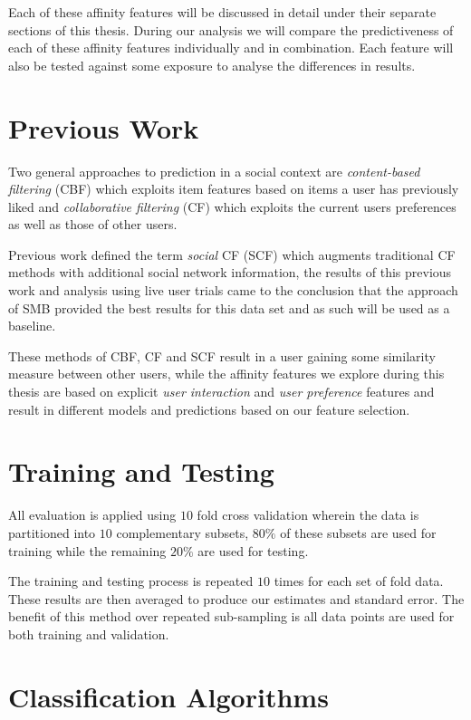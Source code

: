 Each of these affinity features will be discussed in detail under their separate sections of this thesis.
During our analysis we will compare the predictiveness of each of these affinity features individually and in combination.
Each feature will also be tested against some exposure to analyse the differences in results.

\section{Previous Work}
\label{sec:pw}

Two general approaches to prediction in a social context are \emph{content-based filtering} (CBF) \cite{newsweeder} which exploits 
item features based on items a user has previously liked and  \emph{collaborative filtering} (CF) 
\cite{collab_filtering} which exploits the current users preferences as well as those of other users. 

Previous work defined the term \emph{social} CF (SCF) \cite{joseph} which augments traditional CF methods with additional social 
network information, the results of this previous work and analysis using live user trials came to the conclusion that the approach of SMB
provided the best results for this data set and as such will be used as a baseline.

These methods of CBF, CF and SCF result in a user gaining some similarity measure between other users, while the affinity features we 
explore during this thesis are based on explicit \emph{user interaction} and \emph{user preference} features and result in different 
models and predictions based on our feature selection.

\section{Training and Testing}
\label{sec:tt}

All evaluation is applied using $10$ fold cross validation wherein the data is partitioned into $10$ complementary subsets, $80\%$ of 
these subsets are used for training while the remaining $20\%$ are used for testing.

The training and testing process is repeated $10$ times for each set of fold data. These results are then averaged to produce our 
estimates and standard error. The benefit of this method over repeated sub-sampling is all data points are used for both training 
and validation.

\section{Classification Algorithms}
\label{sec:meth}

